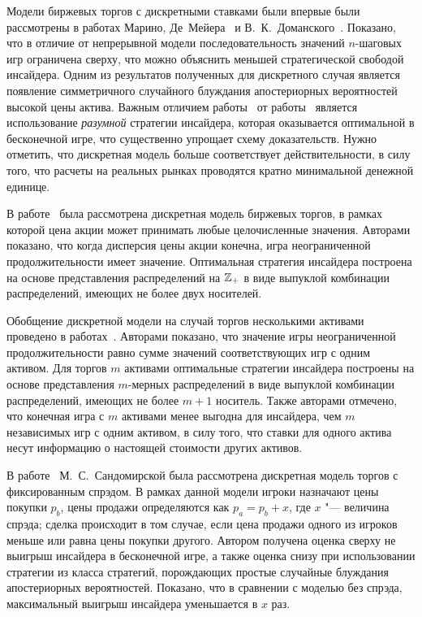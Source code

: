 Модели биржевых торгов с дискретными ставками были впервые были рассмотрены в работах Марино, Де~Мейера~\cite{demeyer05} и В.~К.~Доманского~\cite{domansky07}.
Показано, что в отличие от непрерывной модели последовательность значений $n$-шаговых игр ограничена сверху, что можно объяснить меньшей стратегической свободой инсайдера.
Одним из результатов полученных для дискретного случая является появление симметричного случайного блуждания апостериорных вероятностей высокой цены актива.
Важным отличием работы~\cite{domansky07} от работы~\cite{demeyer05} является использование \emph{разумной} стратегии инсайдера, которая оказывается оптимальной в бесконечной игре, что существенно упрощает схему доказательств. 
Нужно отметить, что дискретная модель больше соответствует действительности, в силу того, что расчеты на реальных рынках проводятся кратно минимальной денежной единице.

В работе~\cite{domansky11} была рассмотрена дискретная модель биржевых торгов, в рамках которой цена акции может принимать любые целочисленные значения.
Авторами показано, что когда дисперсия цены акции конечна, игра неограниченной продолжительности имеет значение.
Оптимальная стратегия инсайдера построена на основе представления распределений на $\mathbb{Z}_+$ в виде выпуклой комбинации распределений, имеющих не более двух носителей.

Обобщение дискретной модели на случай торгов несколькими активами проведено в работах~\cite{domansky13, domansky14}.
Авторами показано, что значение игры неограниченной продолжительности равно сумме значений соответствующих игр с одним активом.
Для торгов $m$ активами оптимальные стратегии инсайдера построены на основе представления $m$-мерных распределений в виде выпуклой комбинации распределений, имеющих не более $m+1$ носитель.
Также авторами отмечено, что конечная игра с $m$ активами менее выгодна для инсайдера, чем $m$ независимых игр с одним активом, в силу того, что ставки для одного актива несут информацию о настоящей стоимости других активов.

В работе~\cite{sandomirskaya14} М.~С.~Сандомирской была рассмотрена дискретная модель торгов с фиксированным спрэдом.
В рамках данной модели игроки назначают цены покупки $p_b$, цены продажи определяются как $p_a = p_b + x$, где $x$ "--- величина спрэда; сделка происходит в том случае, если цена продажи одного из игроков меньше или равна цены покупки другого. 
Автором получена оценка сверху не выигрыш инсайдера в бесконечной игре, а также оценка снизу при использовании стратегии из класса стратегий, порождающих простые случайные блуждания апостериорных вероятностей. 
Показано, что в сравнении с моделью без спрэда, максимальный выигрыш инсайдера уменьшается в $x$ раз.

